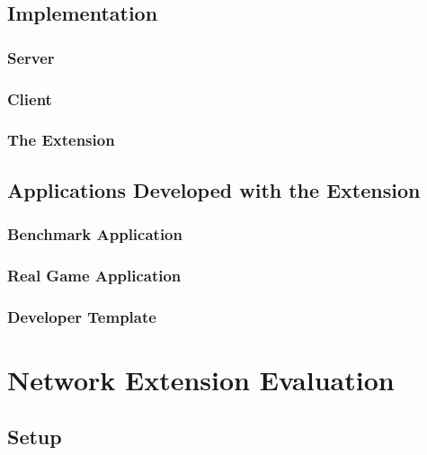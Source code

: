 \documentclass[bsc,frontabs,twoside,singlespacing,parskip,deptreport]{infthesis}     %
\begin{document}
\section{Implementation}
\subsection{Server}
\subsection{Client}
\subsection{The Extension}
\section{Applications Developed with the Extension}
\subsection{Benchmark Application}
\subsection{Real Game Application}
\subsection{Developer Template}







\chapter{Network Extension Evaluation}
\section{Setup}
\end{document}
